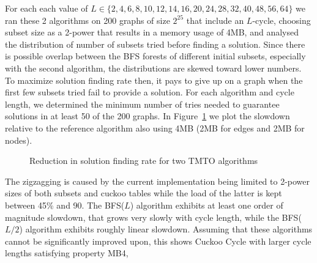 \documentclass[11pt, oneside]{article}
\begin{document}
For each each value of $L \in \{2,4,6,8,10,12,14,16,20,24,28,32,40,48,56,64\}$ we ran these 2 algorithms
on 200 graphs of size $2^{25}$ that include an $L$-cycle,
choosing subset size as a 2-power that results in a memory usage of 4MB,
and analysed the distribution of number of subsets tried before
finding a solution. Since there is possible overlap between the BFS forests of different initial subsets,
especially with the second algorithm, the distributions are skewed toward lower numbers. To maximize solution
finding rate then, it pays to give up on a graph when the first few subsets tried fail to provide a solution.
For each algorithm and cycle length, we determined the minimum number of tries needed to guarantee solutions
in at least 50 of the 200 graphs. In Figure~\ref{slowdown} we plot the slowdown relative
to the reference algorithm also using 4MB (2MB for edges and 2MB for nodes).

\begin{figure}
\begin{center}
\end{center}
\caption{Reduction in solution finding rate for two TMTO algorithms}
\label{slowdown}
\end{figure}

The zigzagging is caused by the current implementation being limited to 2-power sizes of
both subsets and cuckoo tables while the load of the latter is kept between 45\% and 90.
The BFS($L$) algorithm exhibits at least one order of magnitude slowdown, that grows very slowly
with cycle length, while the BFS($L/2$) algorithm exhibits roughly linear slowdown.
Assuming that these algorithms cannot be significantly improved upon,
this shows Cuckoo Cycle with larger cycle lengths satisfying property MB4,
\end{document}
